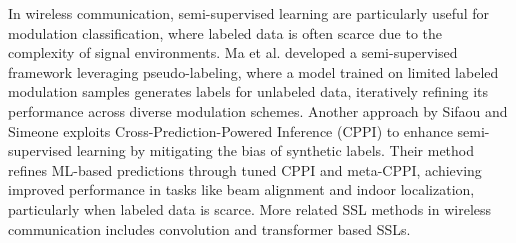 In wireless communication, semi-supervised learning are particularly useful for modulation classification, where labeled data is often scarce due to the complexity of signal environments. Ma et al. \cite{ma2024refined} developed a semi-supervised framework leveraging pseudo-labeling, where a model trained on limited labeled modulation samples generates labels for unlabeled data, iteratively refining its performance across diverse modulation schemes. Another approach by Sifaou and Simeone \cite{sifaou2024semisupervisedlearningcrosspredictionpoweredinference} exploits Cross-Prediction-Powered Inference (CPPI) to enhance semi-supervised learning by mitigating the bias of synthetic labels. Their method refines ML-based predictions through tuned CPPI and meta-CPPI, achieving improved performance in tasks like beam alignment and indoor localization, particularly when labeled data is scarce. More related SSL methods in wireless communication includes convolution \cite{zhang2024sswsrnetsemisupervisedfewshotlearning, ermis2022cnn, pmlr-v77-longi17a} and transformer \cite{kong2023transformer, ren2022sigtefficientendtoendmimoofdm, kunde2023transformers} based SSLs.

